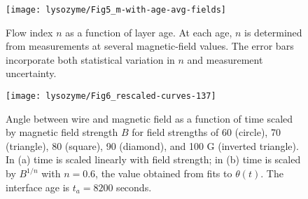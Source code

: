 

\begin{figure}
  \texttt{[image: lysozyme/Fig5\_m-with-age-avg-fields]}
  \caption{\label{fig:m-with-age}Flow index $n$ as a function of layer age. At each age, $n$ is determined from measurements at several magnetic-field values. The error bars incorporate both statistical variation in $n$ and measurement uncertainty.}
\end{figure}




\begin{figure}
 \texttt{[image: lysozyme/Fig6\_rescaled-curves-137]}
 \caption{\label{fig:scaling}Angle between wire and magnetic field as a function of time scaled by magnetic field strength $B$ for field strengths of 60 (circle), 70 (triangle), 80 (square), 90 (diamond), and 100 G (inverted triangle).  In (a) time is scaled linearly with field strength; in (b) time is scaled by $B^{1/n}$ with $n=0.6$, the value obtained from fits to $\theta(t)$. The interface age is $t_a = 8200$ seconds.}
\end{figure}

